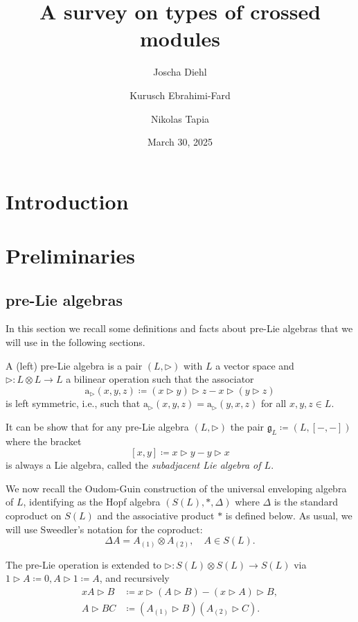 \documentclass[noamsfonts, reqno]{amsart}
\newcommand{\prelie}{\mathbin{\vartriangleright}}
\begin{document}
\title[Types of crossed modules]{A survey on types of crossed modules}
\author[J.~Diehl]{Joscha Diehl}
\address{University of Greifswald}
\author[K.~Ebrahimi-Fard]{Kurusch Ebrahimi-Fard}
\address{Norwegian University of Science and Technology}
\author[N.~Tapia]{Nikolas Tapia}
\address{Weierstrass Institute}
\address{HU Berlin}
\date{March 30, 2025}

\maketitle

\section{Introduction}
\label{s:intro}

\section{Preliminaries}
\subsection{pre-Lie algebras}
In this section we recall some definitions and facts about pre-Lie algebras that we will use in the following sections.
\begin{definition}
  A (left) pre-Lie algebra is a pair \((L,\prelie)\) with \(L\) a vector space and \(\prelie\colon L\otimes L\to L\) a bilinear operation such that the associator
  \begin{equation}\label{eq:PL}
    \mathrm{a}_{\prelie}(x,y,z)\coloneqq (x\prelie y)\prelie z - x\prelie(y\prelie z)\tag{PL}
  \end{equation}
  is left symmetric, i.e., such that \(\mathrm{a}_{\prelie}(x,y,z) = \mathrm{a}_{\prelie}(y,x,z)\) for all \(x,y,z\in L\).
\end{definition}

It can be show that for any pre-Lie algebra \((L,\prelie)\) the pair \(\mathfrak{g}_L\coloneqq(L,[-,-])\) where the bracket
\[
  [x,y]\coloneqq x\prelie y - y\prelie x
\]
is always a Lie algebra, called the \emph{subadjacent Lie algebra of \(L\)}.

We now recall the Oudom-Guin construction of the universal enveloping algebra of \(L\), identifying as the Hopf algebra \((S(L),\ast,\Delta)\) where \(\Delta\) is the standard coproduct on \(S(L)\) and the associative product \(\ast\) is defined below.
As usual, we will use Sweedler's notation for the coproduct:
\[
  \Delta A = A_{(1)}\otimes A_{(2)},\quad A\in S(L).
\]
\begin{definition}
  The pre-Lie operation is extended to \(\prelie\colon S(L)\otimes S(L)\to S(L)\) via \(1\prelie A \coloneqq 0, A\prelie 1 \coloneqq A\), and recursively
  \begin{align}
    xA\prelie B &\coloneqq x\prelie (A\prelie B) - (x\prelie A)\prelie B,\label{eq:OG1}\tag{OG1}\\
    A\prelie BC &\coloneqq (A_{(1)}\prelie B)(A_{(2)}\prelie C).\label{eq:OG2}\tag{OG2}
  \end{align}
\end{definition}
\end{document}
